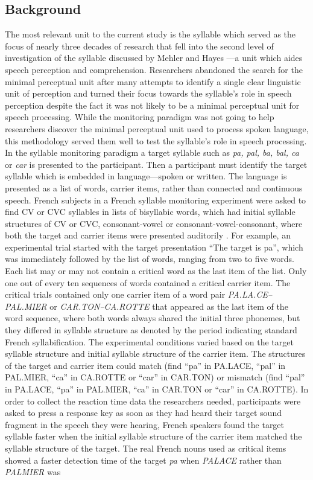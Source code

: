 \subsection{Background}
The most relevant unit to the current study is the syllable which served as the focus of nearly three decades of research that fell into the second level of investigation of the syllable discussed by Mehler and Hayes \parencite*{Mehler1981-wp}---a unit which aides speech perception and comprehension. Researchers abandoned the search for the minimal perceptual unit after many attempts to identify a single clear linguistic unit of perception and turned their focus towards the syllable’s role in speech perception despite the fact it was not likely to be a minimal perceptual unit for speech processing. While the monitoring paradigm was not going to help researchers discover the minimal perceptual unit used to process spoken language, this methodology served them well to test the syllable’s role in speech processing. In the syllable monitoring paradigm a target syllable such as \emph{pa, pal, ba, bal, ca} or \emph{car} is presented to the participant. Then a participant must identify the target syllable which is embedded in language---spoken or written. The language is presented as a list of words, carrier items, rather than connected and continuous speech. French subjects in a French syllable monitoring experiment were asked to find CV or CVC syllables in lists of bisyllabic words, which had initial syllable structures of CV or CVC, consonant-vowel or consonant-vowel-consonant, where both the target and carrier items were presented auditorily \parencite{Mehler1981-vi}. For example, an experimental trial started with the target presentation “The target is pa”, which was immediately followed by the list of words, ranging from two to five words. Each list may or may not contain a critical word as the last item of the list. Only one out of every ten sequences of words contained a critical carrier item. The critical trials contained only one carrier item of a word pair \emph{PA.LA.CE–PAL.MIER} or \emph{CAR.TON–CA.ROTTE} that appeared as the last item of the word sequence, where both words always shared the initial three phonemes, but they differed in syllable structure as denoted by the period indicating standard French syllabification. The experimental conditions varied based on the target syllable structure and initial syllable structure of the carrier item. The structures of the target and carrier item could match (find “pa” in PA.LACE, “pal” in PAL.MIER, “ca” in CA.ROTTE or “car” in CAR.TON) or mismatch (find “pal” in PA.LACE, “pa” in PAL.MIER, “ca” in CAR.TON or “car” in CA.ROTTE). In order to collect the reaction time data the researchers needed, participants were asked to press a response key as soon as they had heard their target sound fragment in the speech they were hearing, French speakers found the target syllable faster when the initial syllable structure of the carrier item matched the syllable structure of the target. The real French nouns used as critical items showed a faster detection time of the target \emph{pa} when \emph{PALACE} rather than \emph{PALMIER} was 